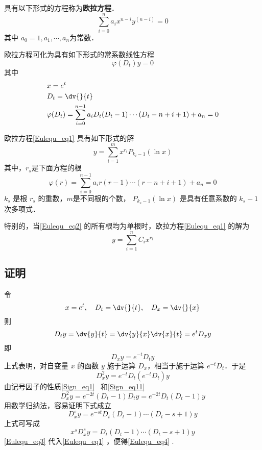 
具有以下形式的方程称为\textbf{欧拉方程}．
\begin{equation}\label{Eulequ_eq1}
\sum_{i=0}^{n}a_ix^{n-i}y^{(n-i)}=0
\end{equation}
其中 $a_0=1,a_1,\cdots,a_n$为常数．

欧拉方程可化为具有如下形式的常系数线性方程
\begin{equation}\label{Eulequ_eq4}
\varphi(D_t)y=0
\end{equation}
其中
\begin{equation}
\begin{aligned}
&x=e^t\\
&D_t=\dv{}{t}\\
&\varphi(D_t)=\sum_{i=0}^{n-1}a_iD_t(D_t-1)\cdots(D_t-n+i+1)+a_n=0
\end{aligned}
\end{equation}

欧拉方程\autoref{Eulequ_eq1} 具有如下形式的解
\begin{equation}\label{Eulequ_eq6}
y=\sum_{i=1}^mx^{r_i}P_{k_i-1}(\ln x)
\end{equation}
其中，$r_s$是下面方程的根
\begin{equation}\label{Eulequ_eq2}
\varphi(r)=\sum_{i=0}^{n-1}a_ir(r-1)\cdots(r-n+i+1)+a_n=0
\end{equation}
$k_s$ 是根 $r_s$ 的重数，$m$是不同根的个数， $P_{k_s-1}(\ln x)$ 是具有任意系数的 $k_s-1$ 次多项式． 

特别的，当\autoref{Eulequ_eq2} 的所有根均为单根时，欧拉方程\autoref{Eulequ_eq1} 的解为
\begin{equation}
y=\sum_{i=1}^{n}C_ix^{r_i}
\end{equation}

\subsection{证明}
令
\begin{equation}
x=e^t,\quad D_t=\dv{}{t},\quad D_x=\dv{}{x}
\end{equation}
则
\begin{equation}
D_ty=\dv{y}{t}=\dv{y}{x}\dv{x}{t}=e^tD_xy
\end{equation}
即
\begin{equation}
D_xy=e^{-t}D_ty
\end{equation}
上式表明，对自变量 $x$ 的函数 $y$ 施于运算 $D_x$，相当于施于运算 $e^{-t}D_t$．于是
\begin{equation}
D_x^2y=e^{-t}D_t(e^{-t}D_t)y
\end{equation}
由记号因子的性质\autoref{Sign_eq1}~ 和\autoref{Sign_eq11}~
\begin{equation}
D_x^2y=e^{-2t}(D_t-1)D_ty=e^{-2t}D_t(D_t-1)y
\end{equation}
用数学归纳法，容易证明下式成立
\begin{equation}
D_x^sy=e^{-st}D_t(D_t-1)\cdots (D_t-s+1)y
\end{equation}
上式可写成
\begin{equation}\label{Eulequ_eq3}
x^sD_x^sy=D_t(D_t-1)\cdots (D_t-s+1)y
\end{equation}
\autoref{Eulequ_eq3} 代入\autoref{Eulequ_eq1} ，便得\autoref{Eulequ_eq4} .

